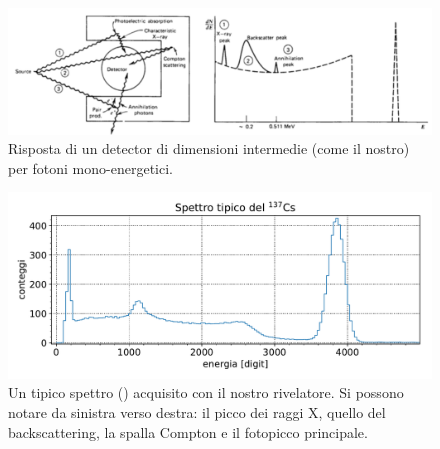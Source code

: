  \begin{figure}[h]
	\centering
	\includegraphics[width=\textwidth]{spettrometro_intermedio}
	\caption{\label{fig:spettrometro_intermedio}Risposta di un detector di dimensioni intermedie (come il nostro) per fotoni mono-energetici.}
 \end{figure}

 \begin{figure}[h]
	\centering
	\includegraphics[width=\textwidth]{spettro_tipico}
	\caption{\label{fig:spettro_tipico}Un tipico spettro (\cs) acquisito con il nostro rivelatore. Si possono notare da sinistra verso destra: il picco dei raggi X, quello del backscattering, la spalla Compton e il fotopicco principale.}
\end{figure}


